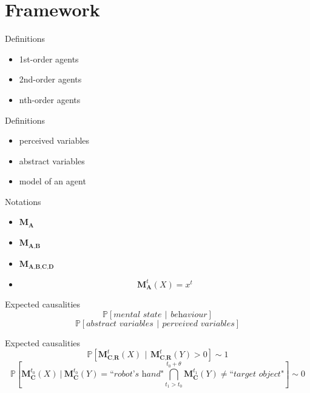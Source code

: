 \documentclass[compress]{beamer}
\newcommand\given[1][]{\:#1\vert\:}
\begin{document}
\section{Framework}

\begin{frame}{Definitions}
\begin{itemize}
	\item 1st-order agents
	\item 2nd-order agents
	\item nth-order agents
\end{itemize}
\end{frame}

\begin{frame}{Definitions}
\begin{itemize}
	\item perceived variables
	\item abstract variables
	\item model of an agent
\end{itemize}
\end{frame}

\begin{frame}{Notations}
\begin{itemize}
	\item $\textbf{M}_{\textbf{A}}$
	\item $\textbf{M}_{\textbf{A,B}}$
	\item $\textbf{M}_{\textbf{A,B,C,D}}$
	\item $$\displaystyle \textbf{M}^t_{\textbf{A}}(X) = x^t$$
\end{itemize}
\end{frame}


\begin{frame}{Expected causalities}
$$ \mathbb{P}\left[\textit{mental state}\,\given[\Big]\,\textit{behaviour}\right]$$
$$ \mathbb{P}\left[\textit{abstract variables}\,\given[\Big]\,\textit{perveived variables}\right]$$
\end{frame}

\begin{frame}{Expected causalities}
$$ \mathbb{P}\left[\textbf{M}^t_{\textbf{C,R}}(X)\,\given[\Big]\,\textbf{M}^t_{\textbf{C,R}}(Y)>0\right]\sim 1$$
$$\mathbb{P}\left[ \textbf{M}^{t_0}_{\textbf{C}}(X) \given[\Big] \textbf{M}^{t_0}_{\textbf{C}}(Y)=\textit{``robot's hand"} \bigcap\limits^{t_0+\theta}_{t_1>t_0} \textbf{M}^{t_1}_{\textbf{C}}(Y)\neq\textit{``target object"}\right]\sim 0$$
\end{frame}
\end{document}
